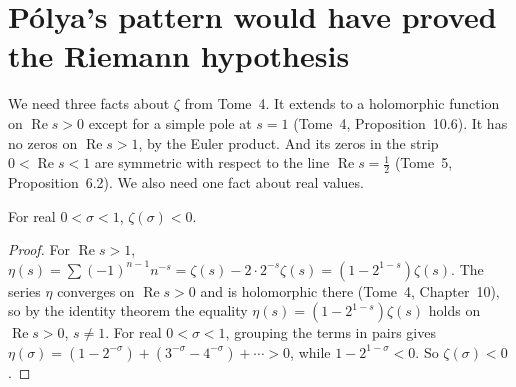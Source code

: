 \section{P\'olya's pattern would have proved the Riemann hypothesis}

We need three facts about $\zeta$ from Tome~4. It extends to a holomorphic function on $\operatorname{Re}s>0$ except for a simple pole at $s=1$
(Tome~4, Proposition~10.6). It has no zeros on $\operatorname{Re}s>1$, by the Euler product. And its zeros in the strip $0<\operatorname{Re}s<1$ are symmetric
with respect to the line $\operatorname{Re}s=\frac12$ (Tome~5, Proposition~6.2). We also need one fact about real values.

\begin{lemma}\label{conjectures:lem:zetaneg}
For real $0<\sigma<1$, $\zeta(\sigma)<0$.
\end{lemma}
\begin{proof}
For $\operatorname{Re}s>1$, $\eta(s)=\sum(-1)^{n-1}n^{-s}=\zeta(s)-2\cdot2^{-s}\zeta(s)=(1-2^{1-s})\zeta(s)$. The series $\eta$ converges on $\operatorname{Re}s>0$
and is holomorphic there (Tome~4, Chapter~10), so by the identity theorem the equality $\eta(s)=(1-2^{1-s})\zeta(s)$ holds on $\operatorname{Re}s>0$, $s\ne1$. For real
$0<\sigma<1$, grouping the terms in pairs gives $\eta(\sigma)=(1-2^{-\sigma})+(3^{-\sigma}-4^{-\sigma})+\cdots>0$, while $1-2^{1-\sigma}<0$. So $\zeta(\sigma)<0$.
\end{proof}

